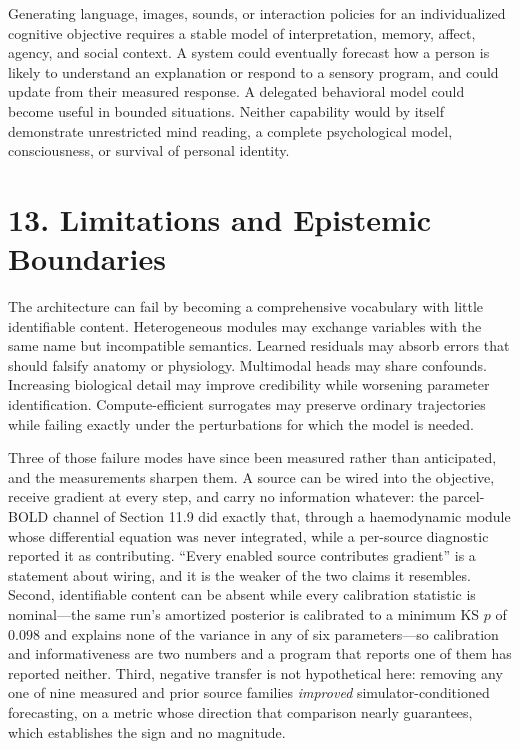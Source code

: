 Generating language, images, sounds, or interaction policies for an
individualized cognitive objective requires a stable model of interpretation,
memory, affect, agency, and social context. A system could eventually forecast
how a person is likely to understand an explanation or respond to a sensory
program, and could update from their measured response. A delegated behavioral
model could become useful in bounded situations. Neither capability would by
itself demonstrate unrestricted mind reading, a complete psychological model,
consciousness, or survival of personal identity.

\section{13. Limitations and Epistemic Boundaries}

The architecture can fail by becoming a comprehensive vocabulary with little
identifiable content. Heterogeneous modules may exchange variables with the
same name but incompatible semantics. Learned residuals may absorb errors that
should falsify anatomy or physiology. Multimodal heads may share confounds.
Increasing biological detail may improve credibility while worsening
parameter identification. Compute-efficient surrogates may preserve ordinary
trajectories while failing exactly under the perturbations for which the model
is needed.

Three of those failure modes have since been measured rather than anticipated,
and the measurements sharpen them. A source can be wired into the objective,
receive gradient at every step, and carry no information whatever: the
parcel-BOLD channel of Section 11.9 did exactly that, through a haemodynamic
module whose differential equation was never integrated, while a per-source
diagnostic reported it as contributing. ``Every enabled source contributes
gradient'' is a statement about wiring, and it is the weaker of the two claims it
resembles. Second, identifiable content can be absent while every calibration
statistic is nominal---the same run's amortized posterior is calibrated to a
minimum KS \(p\) of \(0.098\) and explains none of the variance in any of six
parameters---so calibration and informativeness are two numbers and a program
that reports one of them has reported neither. Third, negative transfer is not
hypothetical here: removing any one of nine measured and prior source families
\emph{improved} simulator-conditioned forecasting, on a metric whose direction
that comparison nearly guarantees, which establishes the sign and no magnitude.

